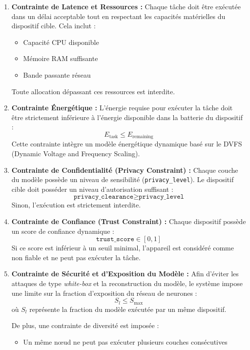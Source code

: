 \documentclass[12pt,a4paper]{article}
\begin{document}
\begin{enumerate}

    \item \textbf{Contrainte de Latence et Ressources :}  
    Chaque tâche doit être exécutée dans un délai acceptable tout en respectant les capacités matérielles du dispositif cible. Cela inclut :
    \begin{itemize}
        \item Capacité CPU disponible
        \item Mémoire RAM suffisante
        \item Bande passante réseau
    \end{itemize}
    Toute allocation dépassant ces ressources est interdite.

    \item \textbf{Contrainte Énergétique :}  
    L'énergie requise pour exécuter la tâche doit être strictement inférieure à l'énergie disponible dans la batterie du dispositif :
    \begin{equation}
        E_{\text{task}} \leq E_{\text{remaining}}
    \end{equation}
    Cette contrainte intègre un modèle énergétique dynamique basé sur le DVFS (Dynamic Voltage and Frequency Scaling).

    \item \textbf{Contrainte de Confidentialité (Privacy Constraint) :}  
    Chaque couche du modèle possède un niveau de sensibilité (\texttt{privacy\_level}).  
    Le dispositif cible doit posséder un niveau d'autorisation suffisant :
    \begin{equation}
        \texttt{privacy\_clearance} \geq \texttt{privacy\_level}
    \end{equation}
    Sinon, l'exécution est strictement interdite.

    \item \textbf{Contrainte de Confiance (Trust Constraint) :}  
    Chaque dispositif possède un score de confiance dynamique :
    \begin{equation}
        \texttt{trust\_score} \in [0,1]
    \end{equation}
    Si ce score est inférieur à un seuil minimal, l'appareil est considéré comme non fiable et ne peut pas exécuter la tâche.

    \item \textbf{Contrainte de Sécurité et d'Exposition du Modèle :}  
    Afin d'éviter les attaques de type \textit{white-box} et la reconstruction du modèle, le système impose une limite sur la fraction d'exposition du réseau de neurones :
    \begin{equation}
        S_l \leq S_{\text{max}}
    \end{equation}
    où $S_l$ représente la fraction du modèle exécutée par un même dispositif.

    De plus, une contrainte de diversité est imposée :
    \begin{itemize}
        \item Un même nœud ne peut pas exécuter plusieurs couches consécutives
    \end{itemize}

\end{enumerate}
\end{document}
